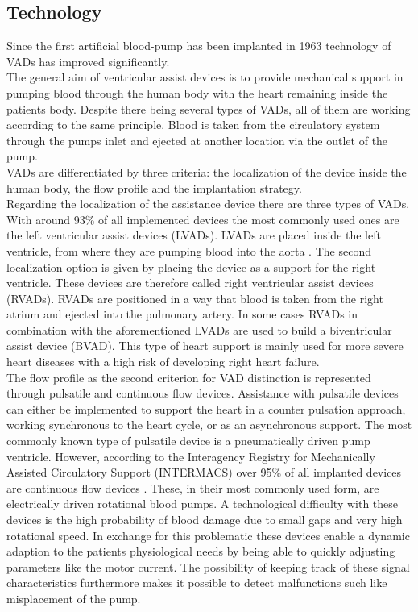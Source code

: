 \subsection{Technology}
Since the first artificial blood-pump has been implanted in 1963 \cite{VAD9} technology of VADs has improved significantly.
\\The general aim of ventricular assist devices is to provide mechanical support in pumping blood through the human body with the heart remaining inside the patients body. Despite there being several types of VADs, all of them are working according to the same principle. Blood is taken from the circulatory system through the pumps inlet and ejected at another location via the outlet of the pump.\cite{VAD1}
\\VADs are differentiated by three criteria: the localization of the device inside the human body, the flow profile and the implantation strategy.
\\Regarding the localization of the assistance device there are three types of VADs. With around 93{\%} of all implemented devices the most commonly used ones are the left ventricular assist devices (LVADs). \cite{VAD7} LVADs are placed inside the left ventricle, from where they are pumping blood into the aorta \cite{VAD4}. The second localization option is given by placing the device as a support for  the right ventricle. These devices are therefore called right ventricular assist devices (RVADs). RVADs are positioned in a way that blood is taken from the right atrium and ejected into the pulmonary artery. \cite{VAD7} In some cases RVADs in combination with the aforementioned LVADs are used to build a biventricular assist device (BVAD). This type of heart support is mainly used for more severe heart diseases with a high risk of developing right heart failure. \cite{VAD11}
\\The flow profile as the second criterion for VAD distinction is represented through pulsatile and continuous flow devices. Assistance with pulsatile devices can either be implemented to support the heart in a counter pulsation approach, working synchronous to the heart cycle, or as an asynchronous support. The most commonly known type of pulsatile device is a pneumatically driven pump ventricle. \cite{VAD1}
However, according to the Interagency Registry for Mechanically Assisted Circulatory Support (INTERMACS) over 95{\%} of all implanted devices are continuous flow devices \cite{VAD8}. These, in their most commonly used form, are electrically driven rotational blood pumps. A technological difficulty with these devices is the high probability of blood damage due to small gaps and very high rotational speed. In exchange for this problematic these devices enable a dynamic adaption to the patients physiological needs by being able to quickly adjusting parameters like the motor current. The possibility of keeping track of these signal characteristics furthermore makes it possible to detect malfunctions such like misplacement of the pump. \cite{VAD1}
